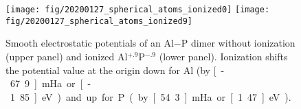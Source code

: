 \documentclass[oribibl]{llncs}
\begin{document}
\begin{figure}
  \begin{minipage}[c]{.990\textwidth}
	\texttt{[image: fig/20200127\_spherical\_atoms\_ionized0]} %
	\texttt{[image: fig/20200127\_spherical\_atoms\_ionized9]} %
  \end{minipage}\hfill
  \begin{minipage}[c]{.009\textwidth}
  \end{minipage}
  \label{fig:ionized-spherical-atoms-AlP-dimer}
  \caption{
   Smooth electrostatic potentials of an Al$-$P dimer 
   without ionization (upper panel) and ionized Al$^{+.9}$P$^{-.9}$ (lower panel).
   Ionization shifts the potential value at the origin down for Al (by \unit[-67.9]{mHa} or \unit[-1.85]{eV})
   and up for P (by \unit[54.3]{mHa} or \unit[1.47]{eV}).
   }
\end{figure}
\end{document}
